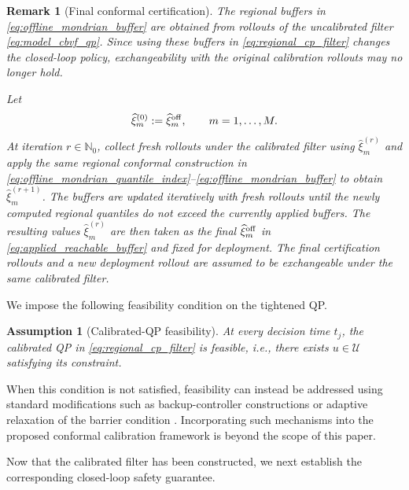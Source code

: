 \documentclass[letterpaper,10pt,conference]{ieeeconf}
\newtheorem{assumption}{Assumption}
\newtheorem{remark}{Remark}
\newcommand{\uv}{u}
\newcommand{\Uv}{\mathcal{U}}
\begin{document}
\begin{remark}[Final conformal certification]
\label{rem:final_cp_certification}
The regional buffers in \eqref{eq:offline_mondrian_buffer} are obtained from
rollouts of the uncalibrated filter \eqref{eq:model_cbvf_qp}. Since using these
buffers in \eqref{eq:regional_cp_filter} changes the closed-loop policy,
exchangeability with the original calibration rollouts may no longer hold.

Let
\begin{equation}
\widehat\xi^{(0)}_{m}
:=
\widehat\xi^{\rm off}_{m},
\qquad
m=1,\ldots,M.
\end{equation}
At iteration $r\in\mathbb N_0$, collect fresh rollouts under the calibrated
filter using $\widehat\xi^{(r)}_{m}$ and apply the same regional conformal
construction in
\eqref{eq:offline_mondrian_quantile_index}--\eqref{eq:offline_mondrian_buffer}
to obtain $\widehat\xi^{(r+1)}_{m}$. The buffers are updated iteratively with
fresh rollouts until the newly computed regional quantiles do not exceed the
currently applied buffers. The resulting values $\widehat\xi^{(r)}_{m}$ are
then taken as the final $\widehat\xi^{\rm off}_{m}$ in
\eqref{eq:applied_reachable_buffer} and fixed for deployment. The final
certification rollouts and a new deployment rollout are assumed to be
exchangeable under the same calibrated filter.
\end{remark}







We impose the following feasibility condition on the tightened QP.

\begin{assumption}[Calibrated-QP feasibility]
\label{ass:calibrated_qp_feasibility}
At every decision time $t_j$, the calibrated QP in
\eqref{eq:regional_cp_filter} is feasible, i.e., there exists
$\uv\in\Uv$ satisfying its constraint.
\end{assumption}

When this condition is not satisfied, feasibility can instead be addressed
using standard modifications such as backup-controller constructions or
adaptive relaxation of the barrier condition
\cite{chen2021backup,zeng2021optimal}. Incorporating such mechanisms into the
proposed conformal calibration framework is beyond the scope of this paper.

Now that the calibrated filter has been constructed, we next establish the corresponding closed-loop safety guarantee.
\end{document}

